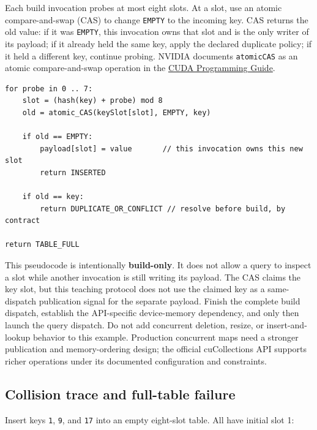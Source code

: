 Each build invocation probes at most eight slots. At a slot, use an atomic compare-and-swap (CAS) to change \texttt{EMPTY} to the incoming key. CAS returns the old value: if it was \texttt{EMPTY}, this invocation owns that slot and is the only writer of its payload; if it already held the same key, apply the declared duplicate policy; if it held a different key, continue probing. NVIDIA documents \texttt{atomicCAS} as an atomic compare-and-swap operation in the \href{https://docs.nvidia.com/cuda/cuda-programming-guide/pdf/cuda-programming-guide.pdf}{CUDA Programming Guide}.

\begin{verbatim}
for probe in 0 .. 7:
    slot = (hash(key) + probe) mod 8
    old = atomic_CAS(keySlot[slot], EMPTY, key)

    if old == EMPTY:
        payload[slot] = value       // this invocation owns this new slot
        return INSERTED

    if old == key:
        return DUPLICATE_OR_CONFLICT // resolve before build, by contract

return TABLE_FULL
\end{verbatim}

This pseudocode is intentionally \textbf{build-only}. It does not allow a query to inspect a slot while another invocation is still writing its payload. The CAS claims the key slot, but this teaching protocol does not use the claimed key as a same-dispatch publication signal for the separate payload. Finish the complete build dispatch, establish the API-specific device-memory dependency, and only then launch the query dispatch. Do not add concurrent deletion, resize, or insert-and-lookup behavior to this example. Production concurrent maps need a stronger publication and memory-ordering design; the official cuCollections API supports richer operations under its documented configuration and constraints.

\subsection{Collision trace and full-table failure}\label{03-visual-computing-i-ch016-collision-trace-and-full-table-failure}

\hypertarget{03-visual-computing-i-ch016-collision-trace-and-full-table-failure}{}

Insert keys \texttt{1}, \texttt{9}, and \texttt{17} into an empty eight-slot table. All have initial slot 1:


